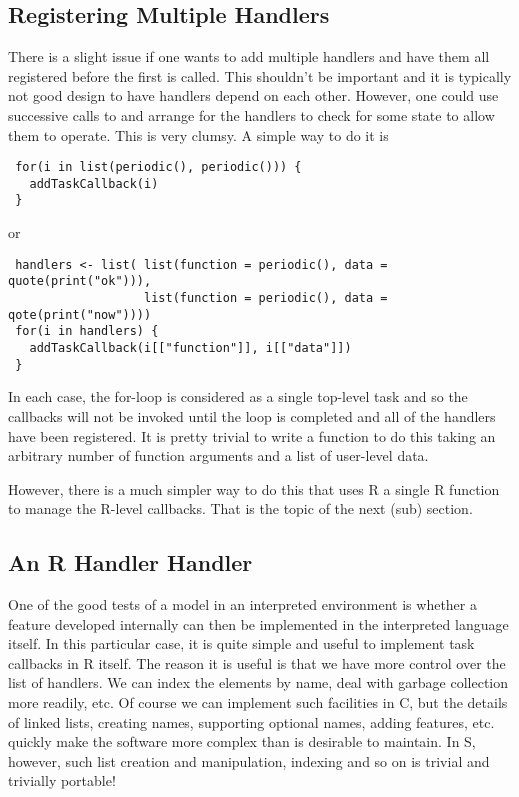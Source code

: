 \documentclass{article}
\begin{document}
\subsection{Registering Multiple Handlers}

There is a slight issue if one wants to add multiple handlers and have
them all registered before the first is called. This shouldn't be
important and it is typically not good design to have handlers depend
on each other.  However, one could use successive calls to
 and arrange for the handlers to check for some
state to allow them to operate.  This is very clumsy.  A simple way to
do it is
\begin{verbatim}
 for(i in list(periodic(), periodic())) {  
   addTaskCallback(i)
 }
\end{verbatim}
or
\begin{verbatim}
 handlers <- list( list(function = periodic(), data = quote(print("ok"))),
                   list(function = periodic(), data = qote(print("now"))))
 for(i in handlers) {  
   addTaskCallback(i[["function"]], i[["data"]])
 }
\end{verbatim}
In each case, the for-loop is considered as a single top-level task
and so the callbacks will not be invoked until the loop is completed
and all of the handlers have been registered.  It is pretty trivial to
write a function to do this taking an arbitrary number of function
arguments and a list of user-level data.

However, there is a much simpler way to do this that uses R a single R
function to manage the R-level callbacks.  That is the topic of the
next (sub) section.

\subsection{An R Handler Handler}
One of the good tests of a model in an interpreted environment is
whether a feature developed internally can then be implemented in the
interpreted language itself. In this particular case, it is quite
simple and useful to implement task callbacks in R itself. The reason
it is useful is that we have more control over the list of handlers.
We can index the elements by name, deal with garbage collection more
readily, etc. Of course we can implement such facilities in C, but the
details of linked lists, creating names, supporting optional names,
adding features, etc.  quickly make the software more complex than is
desirable to maintain. In S, however, such list creation and
manipulation, indexing and so on is trivial and trivially portable!
\end{document}

